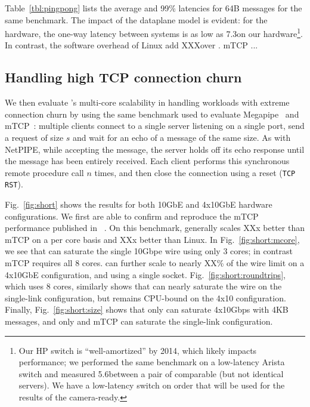 Table~\ref{tbl:pingpong} lists the average and 99\% latencies for 64B
messages for the same benchmark.  The impact of the \ix dataplane
model is evident: for the hardware, the one-way latency between \ix
systems is as low as 7.3\microsecond on our hardware\footnote{Our
HP switch is ``well-amortized'' by 2014, which likely impacts
  performance; we performed the same benchmark on a low-latency Arista
  switch and measured 5.6\microsecond between a pair of comparable
  (but not identical servers). We have a low-latency switch on order
  that will be used for the results of the camera-ready.}.  In
contrast, the software overhead of Linux add XXX\microsecond over \ix.
mTCP ... 


\subsection{Handling high TCP connection churn}
\label{sec:eval:short}



We then evaluate \ix's multi-core scalability in handling workloads
with extreme connection churn by using the same benchmark used to evaluate
Megapipe~\cite{han2012megapipe} and mTCP~\cite{jeong2014mtcp}:
multiple clients connect to a single server listening on a single
port, send a request of size $s$ and wait for an echo of a message of
the same size.  As with NetPIPE, while accepting the message, the server holds off its
echo response until the message has been entirely received.
Each client performs this synchronous remote procedure
call $n$ times, and then close the connection using a reset
(\texttt{TCP RST}).


 Fig.~\ref{fig:short} shows the results for both
10GbE and 4x10GbE hardware configurations.  We first
are able to confirm and reproduce the mTCP performance published in
~\cite{jeong2014mtcp}.  On this benchmark, \ix generally scales XXx
better than mTCP on a per core basis and XXx better than Linux.  In
Fig.~\ref{fig:short:mcore}, we see that \ix can saturate the single
10Gbpe wire using only 3 cores; in contrast mTCP requires all 8
cores. \ix can further scale to nearly XX\% of the wire limit on a
4x10GbE configuration, and using a single socket.
Fig.~\ref{fig:short:roundtrips}, which uses 8 cores, similarly shows
that \ix can nearly saturate the wire on the single-link
configuration, but remains CPU-bound on the 4x10 configuration.
Finally, Fig.~\ref{fig:short:size} shows that only \ix can saturate
4x10Gbps with 4KB messages, and only \ix and mTCP can saturate the
single-link configuration.


